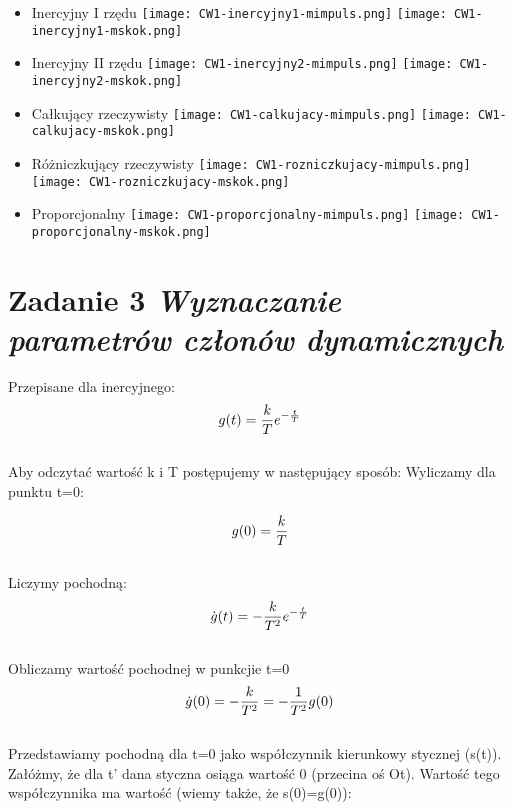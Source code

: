 \documentclass[a4paper,10pt]{article}
\begin{document}
\begin{itemize}
\item Inercyjny I rzędu
\newline \texttt{[image: CW1-inercyjny1-mimpuls.png]}
\newline \texttt{[image: CW1-inercyjny1-mskok.png]}
\item Inercyjny II rzędu
\newline \texttt{[image: CW1-inercyjny2-mimpuls.png]}
\newline \texttt{[image: CW1-inercyjny2-mskok.png]}
\item Całkujący rzeczywisty
\newline \texttt{[image: CW1-calkujacy-mimpuls.png]}
\newline \texttt{[image: CW1-calkujacy-mskok.png]}
\item Różniczkujący rzeczywisty
\newline \texttt{[image: CW1-rozniczkujacy-mimpuls.png]}
\newline \texttt{[image: CW1-rozniczkujacy-mskok.png]}
\item Proporcjonalny
\newline \texttt{[image: CW1-proporcjonalny-mimpuls.png]}
\newline \texttt{[image: CW1-proporcjonalny-mskok.png]}
\end{itemize}

\section{Zadanie 3 \textit{\small Wyznaczanie parametrów członów dynamicznych}}\label{sec:zad3}

Przepisane dla inercyjnego:
	\begin{eqnarray} 
		g(t)={k \over T} e^{-{t \over T}}
	\end{eqnarray}\\
	
Aby odczytać wartość k i T postępujemy w następujący sposób:
Wyliczamy dla punktu t=0:

	\begin{eqnarray} 
		g(0)={k \over T}
	\end{eqnarray}\\
	Liczymy pochodną:
	\begin{eqnarray} 
		\dot{g}(t)=-{k \over T^{2}} e^{-{t \over T}}
	\end{eqnarray}\\
	Obliczamy wartość pochodnej w punkcjie t=0
	\begin{eqnarray} 
		\dot{g}(0)=-{k \over T^{2}}=-{1 \over T^{2}}g(0)
	\end{eqnarray}\\
Przedstawiamy pochodną dla t=0 jako współczynnik kierunkowy stycznej (s(t)). Załóżmy, że dla t’
dana styczna osiąga wartość 0 (przecina oś Ot). Wartość tego współczynnika ma wartość (wiemy
także, że s(0)=g(0)):
\end{document}
